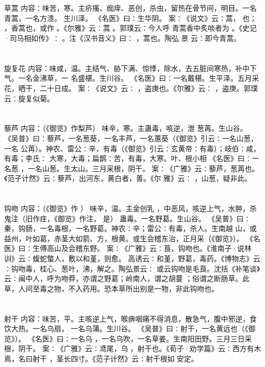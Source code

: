 \documentclass[12pt,UTF8]{ctexbook}
\begin{document}
\section{}草蒿
内容：味苦，寒。主疥瘙、痂痒、恶创，杀虫，留热在骨节间，明目。一名青蒿，一名方溃。 
生川泽。 
《名医》曰∶生华阴。 
案∶《说文》云∶蒿， 也； ，香蒿也，或作 。《尔雅》云∶蒿 。郭璞云∶今人呼 
青蒿香中炙啖者为 。《史记·司马相如传》∶ 。注《汉书音义》曰∶ ，蒿也。陶弘 
景 
云∶即今青蒿。 


\section{}旋复花
内容：味咸，温。主结气、胁下满、惊悸，除水，去五脏间寒热，补中下气。一名金沸草，一 
名盛椹。生川谷。 
《名医》曰∶一名戴椹。生平泽。五月采花，晒干，二十日成。 
案∶《说文》云∶ ，盗庚也。《尔雅》云∶ ，盗庚。郭璞云∶旋复似菊。 


\section{}藜芦
内容：（《御览》作梨芦） 
味辛，寒。主蛊毒，咳逆，泄 
葱苒。生山谷。 
《吴普》曰∶藜芦，一名葱葵，一名丰芦，一名蕙葵（《御览》引云∶一名山葱，一名 
公苒）。神农、雷公∶辛，有毒（《御览》引云∶玄黄帝∶有毒）；岐伯∶咸，有毒；李氏∶ 
大寒，大毒；扁鹊∶苦，有毒，大寒。叶、根小相 
《名医》曰∶一名葱 ，一名山葱。生太山。三月采根，阴干。 
案∶《广雅》云∶藜芦，葱苒也。《范子计然》云∶藜芦，出河东，黄白者，善。《尔 
雅》云∶ ，山葱，疑非此。 


\section{}钩吻
内容：（《御览》作 ） 
味辛，温。主金创乳 ，中恶风，咳逆上气，水肿，杀鬼注（旧作疰，《御览》作注， 
是） 
蛊毒。一名野葛。生山谷。 
《吴普》曰∶秦，钩肠，一名毒根，一名野葛。神农∶辛；雷公∶有毒，杀人。生南越 
山，或益州，叶如葛，赤茎大如箭、方，根黄。或生会稽东治，正月采（《御览》）。 
《名医》曰∶生傅高山及会稽东野。 
案∶《广雅》云∶莨，钩吻也。《淮南子·说林训》云∶蝮蛇螫人，敷以和堇，则愈。 
高诱云∶和堇，野葛，毒药。《博物志》云∶钩吻毒，桂心、葱叶，沸，解之。陶弘景云∶ 
或云钩吻是毛莨。沈括《补笔谈》云∶闽中人，呼为吻莽，亦谓之野葛；岭南人，谓之胡蔓 
；俗谓之断肠草。此草，人间至毒之物，不入药用。恐本草所出别是一物，非此钩吻也。 


\section{}射干
内容：味苦，平。主咳逆上气，喉痹咽痛不得消息，散急气，腹中邪逆，食饮大热。一名乌扇， 
一名乌蒲。生川谷。 
《吴普》曰∶射干，一名黄远也（《御览》）。 
《名医》曰∶一名乌 ，一名乌吹，一名草姜。生南阳田野。三月三日采根，阴干。 
案∶《广雅》云∶鸢尾，乌 ，射干也。《荀子·劝学篇》云∶西方有木焉，名曰射干 
，茎长四寸。《范子计然》云∶射干根如 安定。 
\end{document}
